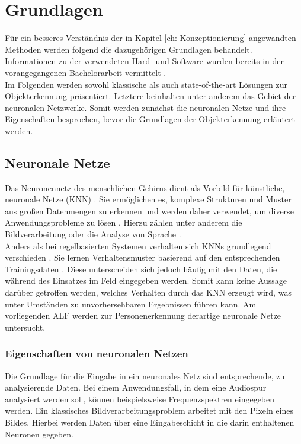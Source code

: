 \chapter{Grundlagen}
\label{ch: Grundlagen}
	Für ein besseres Verständnis der in Kapitel \ref{ch: Konzeptionierung} angewandten Methoden werden folgend die dazugehörigen Grundlagen behandelt. Informationen zu der verwendeten Hard- und Software wurden bereits in der vorangegangenen Bachelorarbeit vermittelt \cite{Bachelorarbeit}.\\
	
	Im Folgenden werden sowohl klassische als auch state-of-the-art Lösungen zur Objekterkennung präsentiert. Letztere beinhalten unter anderem das Gebiet der neuronalen Netzwerke. Somit werden zunächst die neuronalen Netze und ihre Eigenschaften besprochen, bevor die Grundlagen der Objekterkennung erläutert werden. 
 
	
 	\section{Neuronale Netze}
	\label{sec: ROS}
	
	Das Neuronennetz des menschlichen Gehirns dient als Vorbild für künstliche, neuronale Netze (KNN) \cite{neuronennetz}. Sie ermöglichen es, komplexe Strukturen und Muster aus großen Datenmengen zu erkennen und werden daher verwendet, um diverse Anwendungsprobleme zu lösen \cite{neuronennetz}. Hierzu zählen unter anderem die Bildverarbeitung oder die Analyse von Sprache \cite{sinn}.\\
	
	Anders als bei regelbasierten Systemen verhalten sich KNNs grundlegend verschieden \cite{proba}. Sie lernen Verhaltensmuster basierend auf den entsprechenden Trainingsdaten \cite{proba}. Diese unterscheiden sich jedoch häufig mit den Daten, die während des Einsatzes im Feld eingegeben werden. Somit kann keine Aussage darüber getroffen werden, welches Verhalten durch das KNN erzeugt wird, was unter Umständen zu unvorhersehbaren Ergebnissen führen kann. Am vorliegenden ALF werden zur Personenerkennung derartige neuronale Netze untersucht.
	
		\subsection{Eigenschaften von neuronalen Netzen}
		\label{subsec: Eigenschaften von neuronalen Netzen}
		Die Grundlage für die Eingabe in ein neuronales Netz sind entsprechende, zu analysierende Daten. Bei einem Anwendungsfall, in dem eine Audiospur analysiert werden soll, können beispielsweise Frequenzspektren eingegeben werden. Ein klassisches Bildverarbeitungsproblem arbeitet mit den Pixeln eines Bildes. Hierbei werden Daten über eine Eingabeschicht in die darin enthaltenen Neuronen gegeben. \\
		
